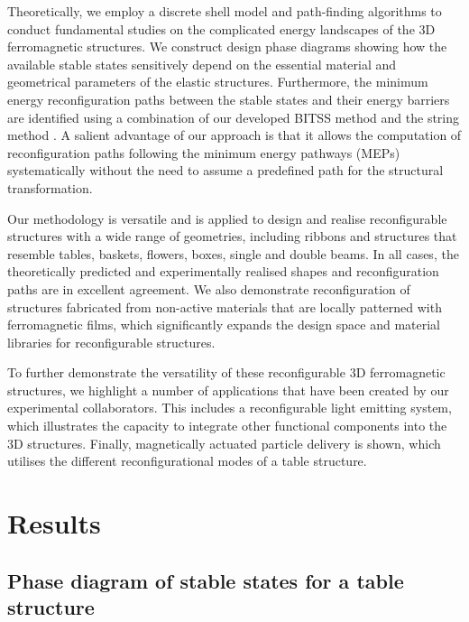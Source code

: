 Theoretically, we employ a discrete shell model \cite{Seung1988,Grinspun2003} and path-finding algorithms \cite{Panter2019,E2007} to conduct fundamental studies on the complicated energy landscapes of the 3D ferromagnetic structures.
We construct design phase diagrams showing how the available stable states sensitively depend on the essential material and geometrical parameters of the elastic structures.
Furthermore, the minimum energy reconfiguration paths between the stable states and their energy barriers are identified using a combination of our developed BITSS method and the string method \cite{E2007}.
A salient advantage of our approach is that it allows the computation of reconfiguration paths following the minimum energy pathways (MEPs) systematically without the need to assume a predefined path for the structural transformation.

Our methodology is versatile and is applied to design and realise reconfigurable structures with a wide range of geometries, including ribbons and structures that resemble tables, baskets, flowers, boxes, single and double beams.
In all cases, the theoretically predicted and experimentally realised shapes and reconfiguration paths are in excellent agreement.
We also demonstrate reconfiguration of structures fabricated from non-active materials that are locally patterned with ferromagnetic films, which significantly expands the design space and material libraries for reconfigurable structures.

To further demonstrate the versatility of these reconfigurable 3D ferromagnetic structures, we highlight a number of applications that have been created by our experimental collaborators.
This includes a reconfigurable light emitting system, which illustrates the capacity to integrate other functional components into the 3D structures.
Finally, magnetically actuated particle delivery is shown, which utilises the different reconfigurational modes of a table structure.



\section{Results}

\subsection{Phase diagram of stable states for a table structure}

